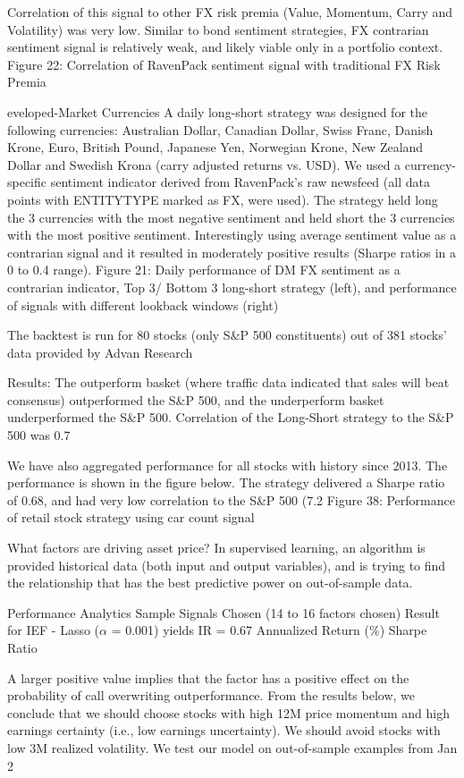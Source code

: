 \documentclass[a4paper]{article}
\begin{document}
Correlation of this signal to other FX risk premia (Value, Momentum, Carry and Volatility) was very low. Similar to bond
sentiment strategies, FX contrarian sentiment signal is relatively weak, and likely viable only in a portfolio context.
Figure 22: Correlation of RavenPack sentiment signal with traditional FX Risk Premia

eveloped-Market Currencies
A daily long-short strategy was designed for the following currencies: Australian Dollar, Canadian Dollar, Swiss Franc,
Danish Krone, Euro, British Pound, Japanese Yen, Norwegian Krone, New Zealand Dollar and Swedish Krona (carry
adjusted returns vs. USD). We used a currency-specific sentiment indicator derived from RavenPack’s raw newsfeed (all
data points with ENTITYTYPE marked as FX, were used). The strategy held long the 3 currencies with the most negative
sentiment and held short the 3 currencies with the most positive sentiment.
Interestingly using average sentiment value as a contrarian signal and it resulted in moderately positive results (Sharpe
ratios in a 0 to 0.4 range).
Figure 21: Daily performance of DM FX sentiment as a contrarian indicator, Top 3/ Bottom 3 long-short strategy (left), and performance of
signals with different lookback windows (right)

The backtest is run for 80 stocks (only S\&P 500 constituents) out of 381 stocks’ data
provided by Advan Research

Results: The outperform basket (where traffic data indicated that sales will beat consensus) outperformed the S\&P 500, and
the underperform basket underperformed the S\&P 500. Correlation of the Long-Short strategy to the S\&P 500 was
0.7%

We have also aggregated performance for all stocks with history since 2013. The performance is shown in the figure below.
The strategy delivered a Sharpe ratio of 0.68, and had very low correlation to the S\&P 500 (7.2%
Figure 38: Performance of retail stock strategy using car count signal

What factors are driving asset price? In supervised learning, an algorithm is provided historical data (both input and output variables), and is trying to find the
relationship that has the best predictive power on out-of-sample data.

Performance Analytics Sample Signals Chosen (14 to 16 factors chosen)
Result for IEF - Lasso ($\alpha$ = 0.001) yields IR = 0.67
Annualized
Return (\%)
Sharpe
Ratio

A larger positive value implies that the
factor has a positive effect on the probability of call overwriting outperformance. From the results below, we conclude that
we should choose stocks with high 12M price momentum and high earnings certainty (i.e., low earnings uncertainty). We
should avoid stocks with low 3M realized volatility.
We test our model on out-of-sample examples from Jan 2
\end{document}
